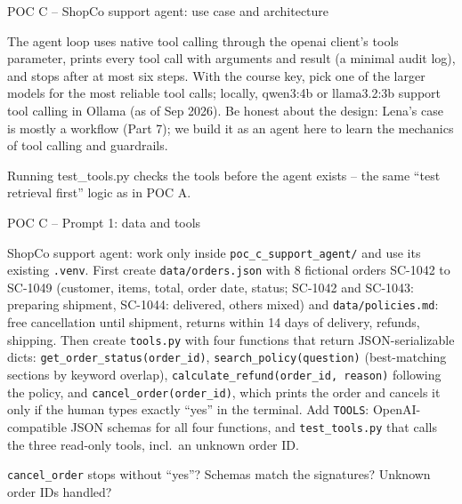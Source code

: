 \documentclass[aspectratio=169,11pt]{beamer}
\begin{document}
\begin{frame}{POC C -- ShopCo support agent: use case and architecture}
{  The agent loop uses native tool calling through the openai client's tools parameter, prints every tool call with arguments and result (a minimal audit log), and stops after at most six steps. With the course key, pick one of the larger models for the most reliable tool calls; locally, qwen3:4b or llama3.2:3b support tool calling in Ollama (as of Sep 2026). Be honest about the design: Lena's case is mostly a workflow (Part 7); we build it as an agent here to learn the mechanics of tool calling and guardrails.\par
  Running test\_tools.py checks the tools before the agent exists -- the same ``test retrieval first'' logic as in POC A.}
\end{frame}

\begin{frame}{POC C -- Prompt 1: data and tools}
  \begin{promptbox}
    \raggedright ShopCo support agent: work only inside \texttt{poc\_c\_support\_agent/} and use its existing \texttt{.venv}. First create \texttt{data/orders.json} with 8 fictional orders SC-1042 to SC-1049 (customer, items, total, order date, status; SC-1042 and SC-1043: preparing shipment, SC-1044: delivered, others mixed) and \texttt{data/policies.md}: free cancellation until shipment, returns within 14 days of delivery, refunds, shipping. Then create \texttt{tools.py} with four functions that return JSON-serializable dicts: \texttt{get\_order\_status(order\_id)}, \texttt{search\_policy(question)} (best-matching sections by keyword overlap), \texttt{calculate\_refund(order\_id, reason)} following the policy, and \texttt{cancel\_order(order\_id)}, which prints the order and cancels it only if the human types exactly ``yes'' in the terminal. Add \texttt{TOOLS}: OpenAI-compatible JSON schemas for all four functions, and \texttt{test\_tools.py} that calls the three read-only tools, incl.\ an unknown order ID.
  \end{promptbox}
  \vspace{4pt}
  \begin{infobox}
    \footnotesize \texttt{cancel\_order} stops without ``yes''? Schemas match the signatures? Unknown order IDs handled?
  \end{infobox}
\end{frame}
\end{document}
